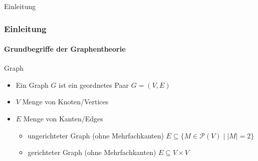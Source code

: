 \begin{frame}
    \Huge Einleitung
\end{frame}
\begin{frame}
    \frametitle{Einleitung}
    \framesubtitle{Grundbegriffe der Graphentheorie}
    \begin{KITexampleblock}{Graph}
\begin{itemize}
    \item Ein Graph $G$ ist ein geordnetes Paar $G = (V, E)$
    \item $V$ Menge von Knoten/Vertices
    \item $E$ Menge von Kanten/Edges
    \begin{itemize}
        \item ungerichteter Graph (ohne Mehrfachkanten) $E \subseteq \{ M \in \mathcal{P}(V) \mid |M| = 2\}$
        \item gerichteter Graph (ohne Mehrfachkanten) $E \subseteq V \times V$
    \end{itemize}
\end{itemize}
    \end{KITexampleblock}
\end{frame}

